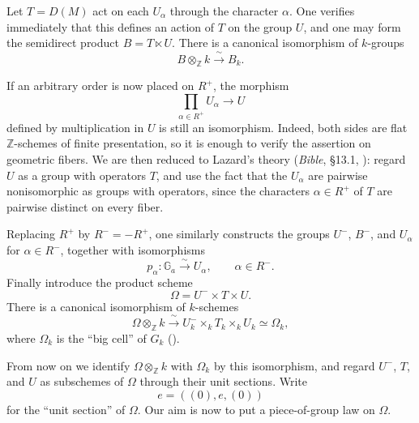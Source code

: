 
Let \(T=D(M)\) act on each \(U_\alpha\) through the character \(\alpha\).
One verifies immediately that this defines an action of \(T\) on the
group \(U\), and one may form the semidirect product \(B=T\ltimes U\).
There is a canonical isomorphism of \(k\)-groups
\[
 B\otimes_{\mathbb Z}k\xrightarrow{\ \sim\ }B_k.
\]

If an arbitrary order is now placed on \(R^+\), the morphism
\[
 \prod_{\alpha\in R^+}U_\alpha\longrightarrow U
\]
defined by multiplication in \(U\) is still an isomorphism. Indeed, both
sides are flat \(\mathbb Z\)-schemes of finite presentation, so it is
enough to verify the assertion on geometric fibers. We are then reduced
to Lazard's theory (\textit{Bible}, \S13.1, ): regard \(U\)
as a group with operators \(T\), and use the fact that the \(U_\alpha\)
are pairwise nonisomorphic as groups with operators, since the characters
\(\alpha\in R^+\) of \(T\) are pairwise distinct on every fiber.




Replacing \(R^+\) by \(R^-=-R^+\), one similarly constructs the groups
\(U^-\), \(B^-\), and \(U_\alpha\) for \(\alpha\in R^-\), together with
isomorphisms
\[
 p_\alpha\colon\mathbb G_a\xrightarrow{\ \sim\ }U_\alpha,
 \qquad \alpha\in R^-.
\]
Finally introduce the product scheme
\[
 \Omega=U^-\times T\times U.
\]
There is a canonical isomorphism of \(k\)-schemes
\[
 \Omega\otimes_{\mathbb Z}k
 \xrightarrow{\ \sim\ }
 U^-_k\times_kT_k\times_kU_k
 \simeq\Omega_k,
\]
where \(\Omega_k\) is the ``big cell'' of \(G_k\) ().

From now on we identify \(\Omega\otimes_{\mathbb Z}k\) with \(\Omega_k\)
by this isomorphism, and regard \(U^-\), \(T\), and \(U\) as subschemes
of \(\Omega\) through their unit sections. Write
\[
 e=((0),e,(0))
\]
for the ``unit section'' of \(\Omega\). Our aim is now to put a
piece-of-group law on \(\Omega\).

